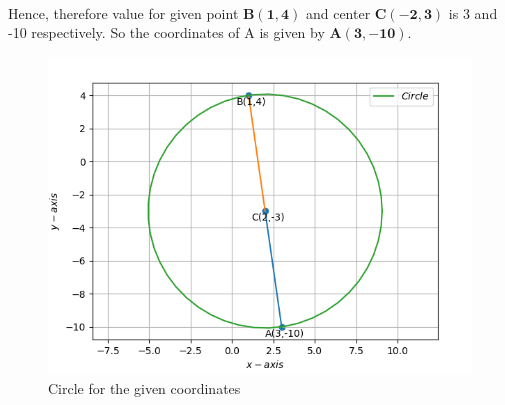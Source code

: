 \documentclass[12pt]{article}
\let\vec\mathbf
\begin{document}
\begin{enumerate}
\begin{align}
    \end{align}
    Hence, therefore value for given point $\vec{B(1,4)}$ and center $\vec{C(-2,3)}$ is 3 and -10 respectively. So the coordinates of A is given by 
  $\vec{A(3,-10)}$.	
\hspace{5mm}
\begin{figure}[!h]
\begin{center}	
	\includegraphics[width=\columnwidth]{./figs/Vector1.png}
\end{center}
\caption{Circle for the given coordinates}
\label{fig:Fig}
\end{figure}
\end{enumerate}
\end{document}
